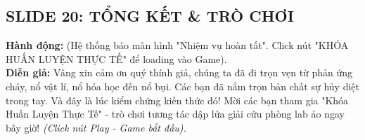 \documentclass[13pt,a4paper]{article}
\begin{document}
\subsection*{SLIDE 20: TỔNG KẾT \& TRÒ CHƠI}
\textbf{Hành động:} (Hệ thống báo màn hình "Nhiệm vụ hoàn tất". Click nút "KHÓA HUẤN LUYỆN THỰC TẾ" để loading vào Game).\\
\textbf{Diễn giả:} Vâng xin cảm ơn quý thính giả, chúng ta đã đi trọn vẹn từ phản ứng cháy, nổ vật lí, nổ hóa học đến nổ bụi. Các bạn đã nắm trọn bản chất sự hủy diệt trong tay. 
Và đây là lúc kiểm chứng kiến thức đó! Mời các bạn tham gia "Khóa Huấn Luyện Thực Tế" - trò chơi tương tác dập lửa giải cứu phòng lab ảo ngay bây giờ!
\textit{(Click nút Play - Game bắt đầu).}
\end{document}
